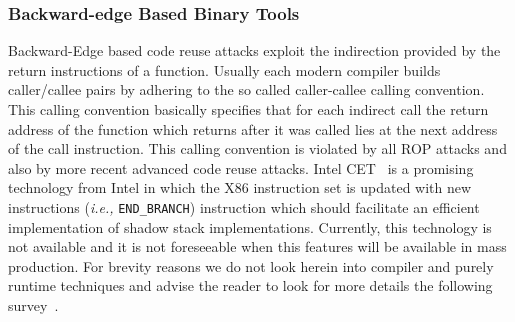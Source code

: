 % 
% 
% 

\subsubsection{Backward-edge Based Binary Tools}
Backward-Edge based code reuse attacks exploit the indirection provided by the return instructions 
of a function. Usually each modern compiler builds caller/callee pairs by adhering to the so called caller-callee
calling convention. This calling convention basically specifies that for each indirect call the return address of the function which returns after 
it was called lies at the next address of the call instruction. 
This calling convention is violated by all ROP attacks and also by 
more recent advanced code reuse attacks. 
Intel CET~\cite{intel:cet} is a promising technology from Intel in which the X86 instruction set is updated with new instructions (\textit{i.e.,} \texttt{END\_BRANCH}) instruction
which should facilitate an efficient implementation of shadow stack implementations. Currently, this technology is not available and it is not foreseeable when this features will 
be available in mass production.
For brevity reasons we do not look herein into compiler and purely runtime techniques and advise the reader to look for 
more details the following survey~\cite{cfi_survey_payer}.

